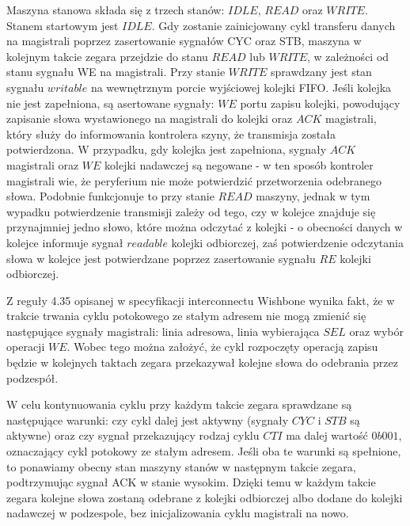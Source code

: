 Maszyna stanowa składa się z trzech stanów: $IDLE$, $READ$ oraz $WRITE$.
Stanem startowym jest $IDLE$. Gdy zostanie zainicjowany cykl transferu danych na magistrali poprzez zasertowanie sygnałów CYC oraz STB, maszyna w kolejnym takcie zegara przejdzie do stanu $READ$ lub $WRITE$, w zależności od stanu sygnału WE na magistrali.
Przy stanie $WRITE$ sprawdzany jest stan sygnału $writable$ na wewnętrznym porcie wyjściowej kolejki FIFO. Jeśli kolejka nie jest zapełniona, są asertowane sygnały: $WE$ portu zapisu kolejki, powodujący zapisanie słowa wystawionego na magistrali do kolejki oraz $ACK$ magistrali, który służy do informowania kontrolera szyny, że transmisja została potwierdzona. W przypadku, gdy kolejka jest zapełniona, sygnały $ACK$ magistrali oraz $WE$ kolejki nadawczej są negowane - w ten sposób kontroler magistrali wie, że peryferium nie może potwierdzić przetworzenia odebranego słowa.
Podobnie funkcjonuje to przy stanie $READ$ maszyny, jednak w tym wypadku potwierdzenie transmisji zależy od tego, czy w kolejce znajduje się przynajmniej jedno słowo, które można odczytać z kolejki - o obecności danych w kolejce informuje sygnał $readable$ kolejki odbiorczej, zaś potwierdzenie odczytania słowa w kolejce jest potwierdzane poprzez zasertowanie sygnału $RE$ kolejki odbiorczej.

Z reguły 4.35 opisanej w specyfikacji interconnectu Wishbone wynika fakt, że w trakcie trwania cyklu potokowego ze stałym adresem nie mogą zmienić się następujące sygnały magistrali: linia adresowa, linia wybierająca $SEL$ oraz wybór operacji $WE$. Wobec tego można założyć, że cykl rozpoczęty operacją zapisu będzie w kolejnych taktach zegara przekazywał kolejne słowa do odebrania przez podzespół.


W celu kontynuowania cyklu przy każdym takcie zegara sprawdzane są następujące warunki: czy cykl dalej jest aktywny (sygnały $CYC$ i $STB$ są aktywne) oraz czy sygnał przekazujący rodzaj cyklu $CTI$ ma dalej wartość $0b001$, oznaczający cykl potokowy ze stałym adresem. Jeśli oba te warunki są spełnione, to ponawiamy obecny stan maszyny stanów w następnym takcie zegara, podtrzymując sygnał ACK w stanie wysokim. Dzięki temu w każdym takcie zegara kolejne słowa zostaną odebrane z kolejki odbiorczej albo dodane do kolejki nadawczej w podzespole, bez inicjalizowania cyklu magistrali na nowo.


